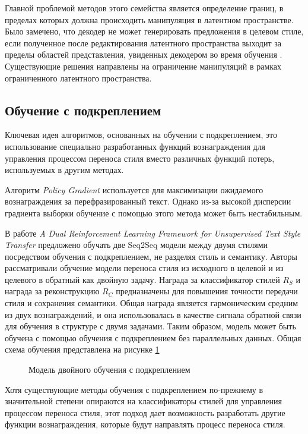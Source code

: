 Главной проблемой методов этого семейства является определение границ, в пределах которых должна происходить манипуляция в латентном пространстве.
Было замечено, что декодер не может генерировать предложения в целевом стиле, если полученное после редактирования латентного пространства выходит за пределы областей представления, увиденных декодером во время обучения \cite{mueller_seq2betterseq}.
Существующие решения направлены на ограничение манипуляций в рамках ограниченного латентного пространства.


\subsection{Обучение с подкреплением}
Ключевая идея алгоритмов, основанных на обучении с подкреплением, это использование специально разработанных функций вознаграждения для управления процессом переноса стиля вместо различных функций потерь, используемых в
другим методах.

Алгоритм \textit{Policy Gradient} \cite{Williams1992SimpleSG} используется для максимизации ожидаемого вознаграждения за перефразированный текст.
Однако из-за высокой дисперсии градиента выборки обучение с помощью этого метода может быть нестабильным.

В работе \textit{A Dual Reinforcement Learning Framework for Unsupervised Text Style Transfer} \cite{luo2019dual} предложено обучать две Seq2Seq модели между двумя стилями посредством обучения с подкреплением, не разделяя стиль и семантику.
Авторы рассматривали обучение модели переноса стиля из исходного в целевой и из целевого в обратный как двойную задачу.
Награда за классификатор стилей $R_S$ и награда за реконструкцию $R_C$ предназначены для повышения точности передачи стиля и сохранения семантики.
Общая награда является гармоническим средним из двух вознаграждений, и она использовалась в качестве сигнала обратной связи для обучения в
структуре с двумя задачами.
Таким образом, модель может быть обучена с помощью обучения с подкреплением без параллельных данных. Общая схема обучения представлена на рисунке \ref{fig:analysis_rl}
\begin{figure}[ht]
  \centering
  \caption{Модель двойного обучения с подкреплением}
  \label{fig:analysis_rl}
\end{figure}

Хотя существующие методы обучения с подкреплением по-прежнему в значительной степени опираются на классификаторы стилей для управления процессом переноса стиля, этот подход дает возможность разработать другие функции вознаграждения, которые будут направлять процесс переноса стиля.

